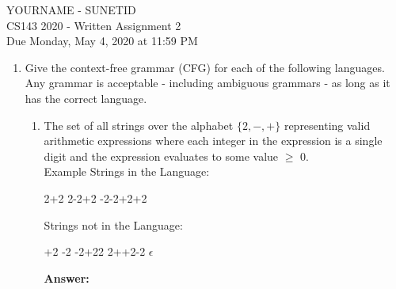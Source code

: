 \documentclass[11pt]{article}
\newcommand\tab[1][1cm]{\hspace*{#1}}
\begin{document}
\begin{center}
\LARGE YOURNAME - SUNETID \\
\Large CS143 2020 - Written Assignment 2 \\
\large Due Monday, May 4, 2020 at 11:59 PM
\end{center}


\begin{enumerate}
  \item  Give the context-free grammar (CFG) for each of the following languages. Any grammar is acceptable - including ambiguous grammars -  as long as it has the correct language.
  \begin{enumerate}
    \item The set of all strings over the alphabet $\{2, -, + \}$ representing valid arithmetic expressions where each integer in the expression is a single digit and the expression evaluates to some value $\geq$ 0. \\ 
    Example Strings in the Language: 
    \begin{center}
     2+2 \tab \tab 2-2+2 \tab \tab -2-2+2+2   
    \end{center}
    Strings not in the Language: 
    \begin{center}
    +2 \tab \tab -2  \tab \tab -2+22 \tab \tab 2++2-2 \tab \tab $\epsilon$
    \end{center}
    \textbf{Answer:} 
  

\end{enumerate}
\end{enumerate}
\end{document}
